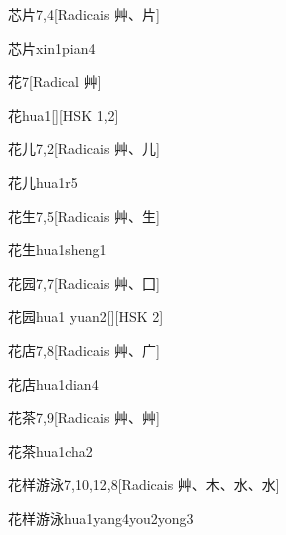 \begin{entry}{芯片}{7,4}[Radicais ⾋、⽚]
  \begin{phonetics}{芯片}{xin1pian4}
  \end{phonetics}
\end{entry}

\begin{entry}{花}{7}[Radical ⾋]
  \begin{phonetics}{花}{hua1}[][HSK 1,2]
  \end{phonetics}
\end{entry}

\begin{entry}{花儿}{7,2}[Radicais ⾋、⼉]
  \begin{phonetics}{花儿}{hua1r5}
  \end{phonetics}
\end{entry}

\begin{entry}{花生}{7,5}[Radicais ⾋、⽣]
  \begin{phonetics}{花生}{hua1sheng1}
  \end{phonetics}
\end{entry}

\begin{entry}{花园}{7,7}[Radicais ⾋、⼞]
  \begin{phonetics}{花园}{hua1 yuan2}[][HSK 2]
  \end{phonetics}
\end{entry}

\begin{entry}{花店}{7,8}[Radicais ⾋、⼴]
  \begin{phonetics}{花店}{hua1dian4}
  \end{phonetics}
\end{entry}

\begin{entry}{花茶}{7,9}[Radicais ⾋、⾋]
  \begin{phonetics}{花茶}{hua1cha2}
  \end{phonetics}
\end{entry}

\begin{entry}{花样游泳}{7,10,12,8}[Radicais ⾋、⽊、⽔、⽔]
  \begin{phonetics}{花样游泳}{hua1yang4you2yong3}
  \end{phonetics}
\end{entry}

